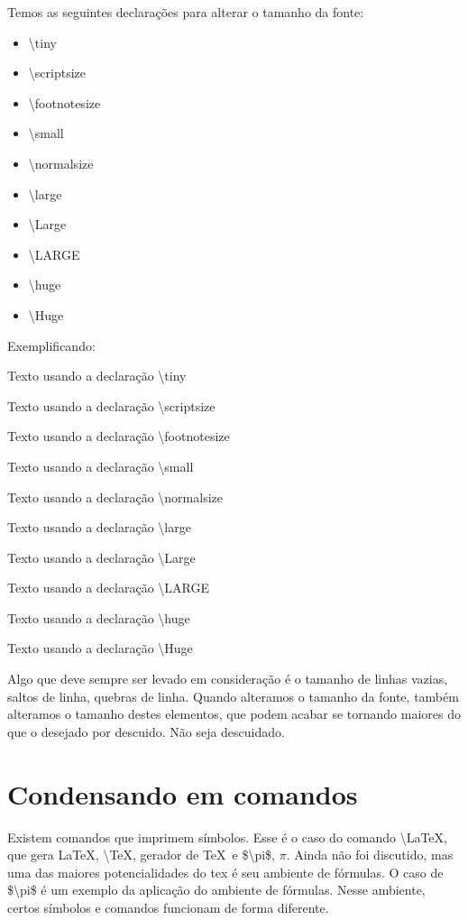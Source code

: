 \documentclass[a4paper, 12pt, oneside]{book}
\begin{document}
Temos as seguintes declarações para alterar o tamanho da fonte:
\begin{multicols}{2}
\begin{itemize}
	\item \textbackslash tiny
	\item \textbackslash scriptsize
	\item \textbackslash footnotesize
	\item \textbackslash small
	\item \textbackslash normalsize
	\item \textbackslash large
	\item \textbackslash Large
	\item \textbackslash LARGE
	\item \textbackslash huge
	\item \textbackslash Huge
\end{itemize}
\end{multicols}

Exemplificando:

{\tiny Texto usando a declaração \textbackslash tiny}

{\scriptsize Texto usando a declaração \textbackslash scriptsize}

{\footnotesize Texto usando a declaração \textbackslash footnotesize}

{\small Texto usando a declaração \textbackslash small}

{\normalsize Texto usando a declaração \textbackslash normalsize}

{\large Texto usando a declaração \textbackslash large}

{\Large Texto usando a declaração \textbackslash Large}

{\LARGE Texto usando a declaração \textbackslash LARGE}

{\huge Texto usando a declaração \textbackslash huge}

{\Huge Texto usando a declaração \textbackslash Huge}

Algo que deve sempre ser levado em consideração é o tamanho de linhas vazias, saltos de linha, quebras de linha.
Quando alteramos o tamanho da fonte, também alteramos o tamanho destes elementos, que podem acabar se tornando maiores do que o desejado por descuido.
Não seja descuidado.

\section{Condensando em comandos}
Existem comandos que imprimem símbolos.
Esse é o caso do comando \textbackslash LaTeX, que gera  \LaTeX, \textbackslash TeX, gerador de \TeX\ e \$\textbackslash pi\$, $\pi$.
Ainda não foi discutido, mas uma das maiores potencialidades do tex é seu ambiente de fórmulas.
O caso de \$\textbackslash pi\$ é um exemplo da aplicação do ambiente de fórmulas.
Nesse ambiente, certos símbolos e comandos funcionam de forma diferente.
\end{document}

